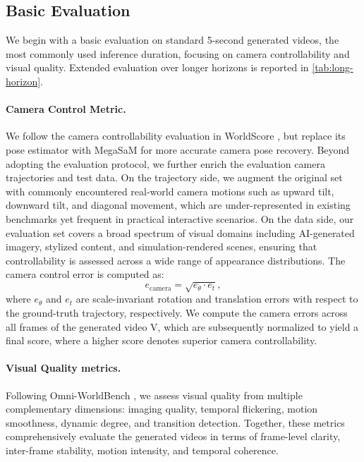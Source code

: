 \subsection{Basic Evaluation}

We begin with a basic evaluation on standard 5-second generated videos, the most commonly used inference duration, focusing on camera controllability and visual quality. Extended evaluation over longer horizons is reported in \cref{tab:long-horizon}.

\paragraph{\bf{Camera Control Metric.}}
We follow the camera controllability evaluation in WorldScore \citep{duan2025worldscore}, but replace its pose estimator with MegaSaM \citep{li2025megasam} for more accurate camera pose recovery. Beyond adopting the evaluation protocol, we further enrich the evaluation camera trajectories and test data. On the trajectory side, we augment the original set with commonly encountered real-world camera motions such as upward tilt, downward tilt, and diagonal movement, which are under-represented in existing benchmarks yet frequent in practical interactive scenarios. On the data side, our evaluation set covers a broad spectrum of visual domains including AI-generated imagery, stylized content, and simulation-rendered scenes, ensuring that controllability is assessed across a wide range of appearance distributions. The camera control error is computed as:
\begin{equation}
    e_{\mathrm{camera}} = \sqrt{e_{\theta} \cdot e_{t}},
\end{equation}
where $e_{\theta}$ and $e_{t}$ are scale-invariant rotation and translation errors with respect to the ground-truth trajectory, respectively. 
We compute the camera errors across all frames of the generated video V, which are subsequently normalized to yield a final score, where a higher score denotes superior camera controllability.

\paragraph{\bf{Visual Quality metrics.}}
Following Omni-WorldBench \citep{wu2026omniworldbench}, we assess visual quality from multiple complementary dimensions: imaging quality, temporal flickering, motion smoothness, dynamic degree, and transition detection. Together, these metrics comprehensively evaluate the generated videos in terms of frame-level clarity, inter-frame stability, motion intensity, and temporal coherence.

